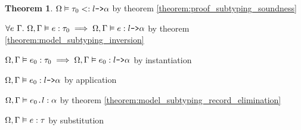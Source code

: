 \documentclass[acmsmall]{acmart}
\theoremstyle{definition}
\newtheorem{theorem}{Theorem}[section]
\begin{document}
\begin{theorem}
  \item \Z\Z $
    \Omega \vDash \tau_0  <: \texttt{$l$->$\alpha$}
  $ by theorem \ref{theorem:proof_subtyping_soundness}
  \item \Z\Z $
    \forall e\ \Gamma .\ \Omega, \Gamma \vDash e :  \tau_0  \implies \Omega, \Gamma \vDash e : \texttt{$l$->$\alpha$}
  $ by theorem \ref{theorem:model_subtyping_inversion}
  \item \Z\Z $
    \Omega, \Gamma \vDash e_0 : \tau_0  \implies \Omega, \Gamma \vDash e_0 : \texttt{$l$->$\alpha$}
  $ by instantiation 
  \item \Z\Z $
    \Omega, \Gamma \vDash e_0 : \texttt{$l$->$\alpha$}
  $ by application 
  \item \Z\Z $
    \Omega, \Gamma \vDash \texttt{$e_0$.$l$} : \alpha 
  $ by theorem \ref{theorem:model_subtyping_record_elimination} 
  \item \Z\Z $
    \Omega, \Gamma \vDash e : \tau
  $ by substitution 



\end{theorem}
\end{document}
